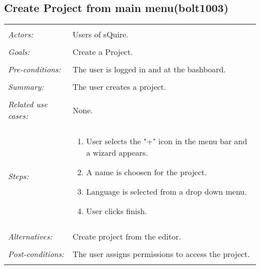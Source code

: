 

\subsection{Create Project from main menu(bolt1003)}
\begin{tabular}{ p{2cm} p{12cm} }
 \hline
 \\
 \textit{Actors:} & Users of sQuire. \\ 
 \\
 \textit{Goals:} & Create a Project. \\
 \\
 \textit{Pre-conditions:} & The user is logged in and at the bashboard. \\
 \\
 \textit{Summary:} & The user creates a project. \\ 
 \\
 \textit{Related use cases:} & None. \\ 
 \\
 \textit{Steps:} & \begin{enumerate}
  \item User selects the "+" icon in the menu bar and a wizard appears.
  \item A name is choosen for the project.
  \item Language is selected from a drop down menu.
  \item User clicks finish.
 \end{enumerate} \\
 \\
 \textit{Alternatives:} & Create project from the editor. \\
 \\
 \textit{Post-conditions:} & The user assigns permissions to access the project. \\
 \\
\hline
\end{tabular}


